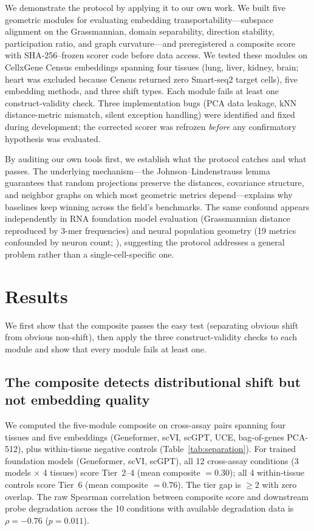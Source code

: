 \documentclass[9pt,lineno]{elife}
\begin{document}
We demonstrate the protocol by applying it to our own work. We built five geometric modules for evaluating embedding transportability---subspace alignment on the Grassmannian, domain separability, direction stability, participation ratio, and graph curvature---and preregistered a composite score with SHA-256--frozen scorer code before data access. We tested these modules on CellxGene Census embeddings spanning four tissues (lung, liver, kidney, brain; heart was excluded because Census returned zero Smart-seq2 target cells), five embedding methods, and three shift types. Each module fails at least one construct-validity check. Three implementation bugs (PCA data leakage, kNN distance-metric mismatch, silent exception handling) were identified and fixed during development; the corrected scorer was refrozen \emph{before} any confirmatory hypothesis was evaluated.

By auditing our own tools first, we establish what the protocol catches and what passes. The underlying mechanism---the Johnson--Lindenstrauss lemma guarantees that random projections preserve the distances, covariance structure, and neighbor graphs on which most geometric metrics depend---explains why baselines keep winning across the field's benchmarks. The same confound appears independently in RNA foundation model evaluation (Grassmannian distance reproduced by 3-mer frequencies) and neural population geometry (19 metrics confounded by neuron count; \citealp{tower2026bracket}), suggesting the protocol addresses a general problem rather than a single-cell-specific one.


\section{Results}

We first show that the composite passes the easy test (separating obvious shift from obvious non-shift), then apply the three construct-validity checks to each module and show that every module fails at least one.

\subsection{The composite detects distributional shift but not embedding quality}

We computed the five-module composite on cross-assay pairs spanning four tissues and five embeddings (Geneformer, scVI, scGPT, UCE, bag-of-genes PCA-512), plus within-tissue negative controls (Table~\ref{tab:separation}). For trained foundation models (Geneformer, scVI, scGPT), all 12 cross-assay conditions (3 models $\times$ 4 tissues) score Tier~2--4 (mean composite $= 0.30$); all 4 within-tissue controls score Tier~6 (mean composite $= 0.76$). The tier gap is $\geq 2$ with zero overlap. The raw Spearman correlation between composite score and downstream probe degradation across the 10 conditions with available degradation data is $\rho = -0.76$ ($p = 0.011$).
\end{document}
